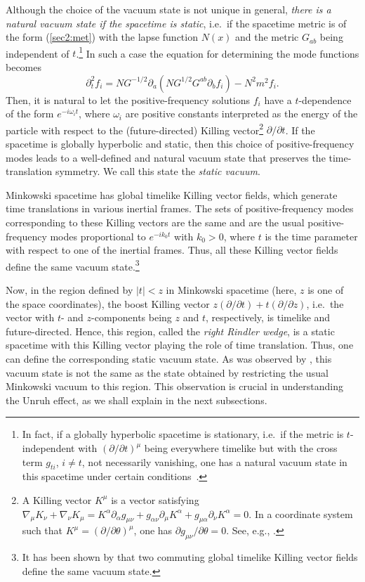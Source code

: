 \documentclass[12pt,nofootinbib,floatfix,aps,prd,showpacs,amsmath,amssymb,eqsecnum]{revtex4-2}
\let\cite\citep
\begin{document}
Although the choice of the vacuum state is not 
unique in general, 
{\em there is a natural vacuum state if the spacetime is static}, 
i.e.~if the spacetime 
metric is of the form (\ref{sec2:met}) with the lapse function $N(x)$ 
and the metric $G_{ab}$ being independent of $t$.\footnote{In fact, if a
globally hyperbolic 
spacetime is stationary, i.e.~if the metric is $t$-independent with
$(\partial/\partial t)^\mu$ being everywhere timelike but with
the cross term $g_{ti}$, $i\neq t$, not necessarily vanishing, one has a
natural vacuum state in this spacetime under certain
conditions~\cite{Ashtekaretal75,Kay78}.}
In such a case the 
equation for determining the mode functions becomes
\begin{equation}
\partial_t^2 f_i = 
NG^{-1/2}\partial_a (N G^{1/2}G^{ab} \partial_b f_i) - N^2 m^2 f_i.
\label{sec2:t-indepeq}
\end{equation}
Then, it is natural to let the positive-frequency solutions 
$f_i$ have a $t$-dependence of the form $e^{-i\omega_i t}$,
where $\omega_i$ are positive constants interpreted as the energy of the
particle with respect to the (future-directed) 
Killing vector\footnote{A Killing vector 
$K^\mu$ is a vector satisfying
$\nabla_\mu K_\nu + \nabla_\nu K_\mu = K^\alpha\partial_\alpha
g_{\mu\nu} + g_{\alpha\nu}\partial_\mu K^\alpha +
g_{\mu\alpha}\partial_\nu K^\alpha = 0$.  In a coordinate system such
that $K^\mu = (\partial/\partial\theta)^\mu$, one has
$\partial g_{\mu\nu}/\partial\theta = 0$. See, e.g., 
\textcite{Waldbook84}.} 
$\partial/\partial t$.
If the spacetime is globally hyperbolic
and static, then this choice of
positive-frequency modes leads to a well-defined and natural 
vacuum state that preserves the time-translation symmetry.  We call this
state the {\em static vacuum}.

Minkowski spacetime has global timelike Killing vector fields, 
which generate
time translations in various inertial frames.  The sets of
positive-frequency modes corresponding to these Killing vectors are the
same and are the usual positive-frequency modes proportional to
$e^{-ik_0 t}$ with $k_0 > 0$, where $t$ is the time parameter with
respect to one of the inertial frames.  Thus, all these Killing vector
fields define the same vacuum state.\footnote{It has been shown by
\textcite{Chmielowski94} that two commuting 
global timelike Killing vector fields define the same vacuum state.}

Now, in the region defined by $|t|<z$ 
in Minkowski spacetime
(here, $z$ is one of the space coordinates), the
boost Killing vector $z(\partial/\partial t) + t(\partial/\partial z)$,
i.e.~the vector with
$t$- and $z$-components being $z$ and $t$, respectively,
is timelike and future-directed.  Hence, this region,
called the {\em right Rindler wedge}, is a static spacetime with this
Killing vector playing the role of time translation. 
Thus, one can define the corresponding static vacuum state.  
As was observed by
\textcite{Fulling73}, this vacuum state is not the same as the state
obtained by restricting the usual Minkowski vacuum to this region.  
This observation is
crucial in understanding the Unruh effect, as we shall explain in the
next subsections.
\end{document}

